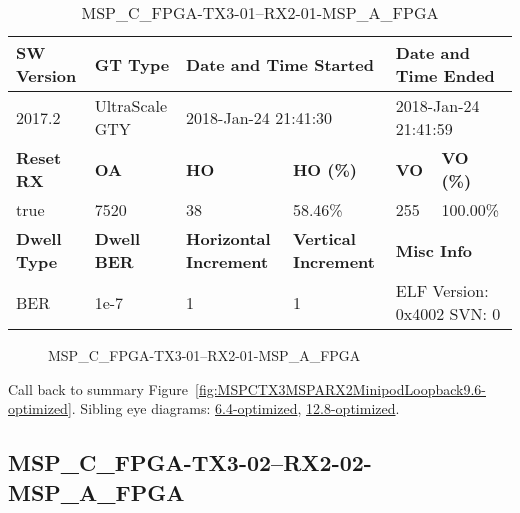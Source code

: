 \begin{table}[h]
\centering
\caption{MSP\_C\_FPGA-TX3-01--RX2-01-MSP\_A\_FPGA}
\label{tab:MSPCFPGATX301RX201MSPAFPGA9.6-optimized}
\begin{tabular}{@{}|l|l|l|l|l|l|@{}}
\toprule
\textbf{SW Version}                & \textbf{GT Type}   & \multicolumn{2}{l|}{\textbf{Date and Time Started}}            & \multicolumn{2}{l|}{\textbf{Date and Time Ended}}        \\ \midrule
2017.2                       & UltraScale GTY          & \multicolumn{2}{l|}{2018-Jan-24 21:41:30}                   & \multicolumn{2}{l|}{2018-Jan-24 21:41:59}               \\ \midrule
\textbf{Reset RX}                  & \textbf{OA} & \textbf{HO}   & \textbf{HO (\%)} & \textbf{VO} & \textbf{VO (\%)} \\ \midrule
true & 7520        & 38          & 58.46\%        & 255        & 100.00\%       \\ \midrule
\textbf{Dwell Type}                & \textbf{Dwell BER} & \textbf{Horizontal Increment} & \textbf{Vertical Increment}    & \multicolumn{2}{l|}{\textbf{Misc Info}}                  \\ \midrule
BER                            & 1e-7        & 1        & 1           & \multicolumn{2}{l|}{ELF Version: 0x4002 SVN: 0}                         \\ \bottomrule
\end{tabular}
\end{table}

\begin{figure}[h]
\caption{MSP\_C\_FPGA-TX3-01--RX2-01-MSP\_A\_FPGA} \label{fig:MSPCFPGATX301RX201MSPAFPGA9.6-optimized}
\end{figure}

Call back to summary Figure~\ref{fig:MSPCTX3MSPARX2MinipodLoopback9.6-optimized}.
Sibling eye diagrams: \hyperref[sec:MSPCFPGATX301RX201MSPAFPGA6.4-optimized]{6.4-optimized}, \hyperref[sec:MSPCFPGATX301RX201MSPAFPGA12.8-optimized]{12.8-optimized}.

\clearpage
\newpage


\subsection{MSP\_C\_FPGA-TX3-02--RX2-02-MSP\_A\_FPGA}\label{sec:MSPCFPGATX302RX202MSPAFPGA9.6-optimized}

